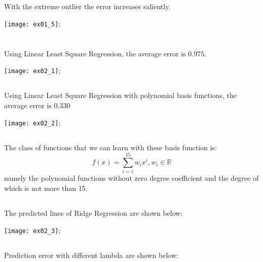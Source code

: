 \documentclass{article}[11pt]
\begin{document}
\subsection{}
With the extreme outlier the error increases saliently.

\begin{center}
  \texttt{[image: ex01\_5]};
\end{center}

\section{}
\subsection{}
Using Linear Least Square Regression, the average error is $0.975$.

\begin{center}
  \texttt{[image: ex02\_1]};
\end{center}

\subsection{}
Using Linear Least Square Regression with polynomial basis functions, the average error is $0.330$

\begin{center}
  \texttt{[image: ex02\_2]};
\end{center}

\subsection{}
The class of functions that we can learn with these basis function is:
\[ f(x) = \sum_{i=1}^{15} w_i x^i, w_i \in \mathbb{R} \]
namely the polynomial functions without zero degree coefficient and the degree of which is not more than 15.

\subsection{}
The predicted lines of Ridge Regression are shown below:

\begin{center}
  \texttt{[image: ex02\_3]};
\end{center}

\subsection{}
Prediction error with different lambda are shown below:
\end{document}
